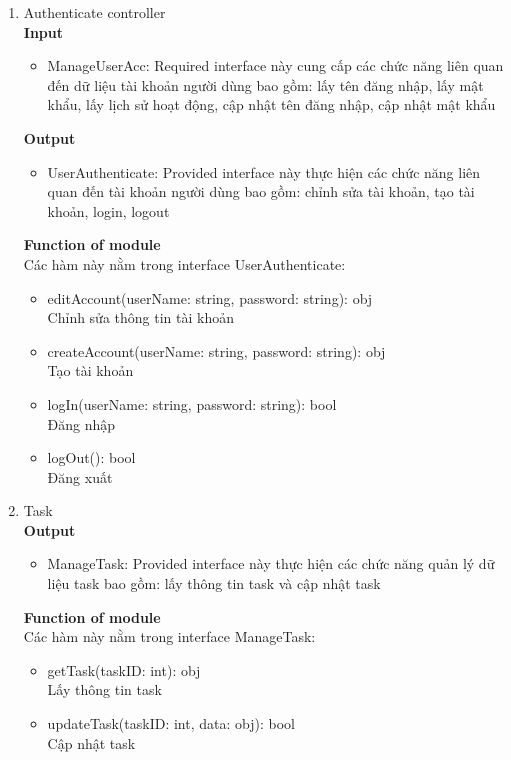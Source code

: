 \documentclass[a4paper]{article}
\begin{document}
\begin{enumerate}
 
  
         \item Authenticate controller \\
 \textbf{Input}
 \begin{itemize}
     \item ManageUserAcc: Required interface này cung cấp các chức năng liên quan đến dữ liệu tài khoản người dùng bao gồm: lấy tên đăng nhập, lấy mật khẩu, lấy lịch sử hoạt động, cập nhật tên đăng nhập, cập nhật mật khẩu
 \end{itemize}
  \textbf{Output}
   \begin{itemize}
     \item UserAuthenticate: Provided interface này thực hiện các chức năng liên quan đến tài khoản
người dùng bao gồm: chỉnh sửa tài khoản, tạo tài khoản, login, logout
 \end{itemize}
  \textbf{Function of module}\\
  Các hàm này nằm trong interface UserAuthenticate:
     \begin{itemize}
\item editAccount(userName: string, password: string): obj
\\ Chỉnh sửa thông tin tài khoản
\item createAccount(userName: string, password: string): obj
\\ Tạo tài khoản
\item logIn(userName: string, password: string): bool
\\ Đăng nhập
\item logOut(): bool
\\ Đăng xuất
 \end{itemize}
 
 
          \item Task \\
  \textbf{Output}
   \begin{itemize}
     \item ManageTask: Provided interface này thực hiện các  chức năng quản lý dữ liệu task bao gồm: lấy
thông tin task và cập nhật task
 \end{itemize}
  \textbf{Function of module}\\
  Các hàm này nằm trong interface ManageTask:
     \begin{itemize}
\item getTask(taskID: int): obj \\
Lấy thông tin task
\item updateTask(taskID: int, data: obj): bool \\
Cập nhật task
 \end{itemize}
 

\end{enumerate}
\end{document}
